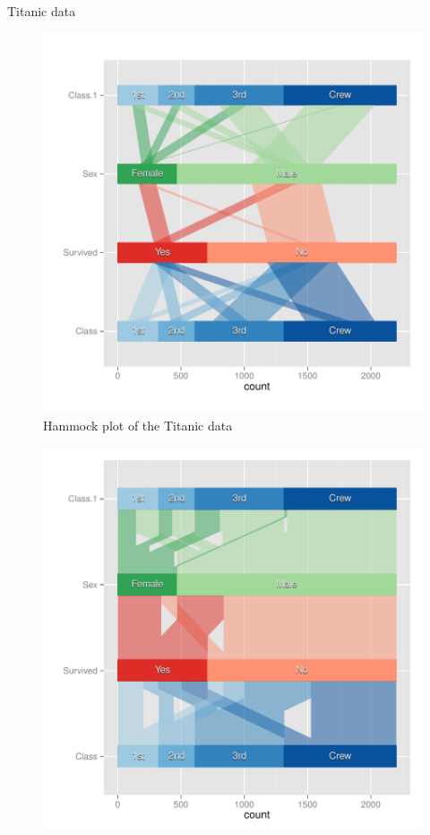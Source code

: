 \documentclass[11pt]{book}
\renewenvironment{knitrout}{\small\renewcommand{\baselinestretch}{.85}}{} %
\begin{document}
\begin{Example}{Titanic data}
\begin{knitrout}
\begin{figure}[!htbp]
\centerline{\includegraphics[width=.6\textwidth]{ch05/fig/titanic-par2} }

\caption[Hammock plot of the Titanic data]{Hammock plot of the Titanic data\label{fig:titanic-par2}}
\end{figure}


\end{knitrout}

\begin{knitrout}
\color{fgcolor}\begin{kframe}
\begin{alltt}
  \hlstd{=}\hlstd{,}
           \hlstd{=}\hlstd{(}\hlstd{,}\hlstd{,}\hlstd{,}\hlstd{),} \hlstd{=}\hlstd{)} \hlopt{+}
  \hlstd{(} \hlstd{=}\hlstd{)} \hlopt{+}
  \hlstd{(} \hlstd{=}\hlstd{)} \hlopt{+} \hlstd{()}
\end{alltt}
\end{kframe}\begin{figure}[!htbp]


\centerline{\includegraphics[width=.6\textwidth]{ch05/fig/titanic-par3} }


\end{figure}
\end{knitrout}
\end{Example}
\end{document}
